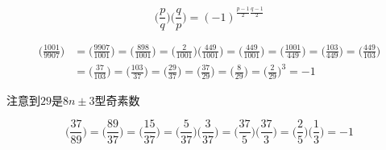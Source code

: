 \begin{theorem}[Gauss二次互反律]
	\begin{equation*}
		\Big(\frac{p}{q} \Big)\Big(\frac{q}{p}\Big)=(-1)^{\frac{p-1}{2}\frac{q-1}{2}}
	\end{equation*}
\end{theorem}
\begin{example}
	\begin{equation*}
		\begin{split}
			\Big(\frac{1001}{9907}\Big) &= \Big(\frac{9907}{1001}\Big) = \Big(\frac{898}{1001}\Big) = \Big(\frac{2}{1001}\Big)\Big(\frac{449}{1001}\Big) = \Big(\frac{449}{1001}\Big) = \Big(\frac{1001}{449}\Big) = \Big(\frac{103}{449}\Big) = \Big(\frac{449}{103}\Big)\\
			&
=\Big(\frac{37}{103}\Big)= \Big(\frac{103}{37}\Big) = \Big(\frac{29}{37}\Big) = \Big(\frac{37}{29}\Big) = \Big(\frac{8}{29}\Big) = \Big(\frac{2}{29}\Big)^3 = -1
		\end{split}
	\end{equation*} 
\end{example}
\begin{note}
	注意到$29$是$8n\pm 3$型奇素数
\end{note}
\begin{example}
	\begin{equation*}
		\Big(\frac{37}{89}\Big) = \Big(\frac{89}{37}\Big) = \Big(\frac{15}{37}\Big) = \Big(\frac{5}{37}\Big)\Big(\frac{3}{37}\Big) = \Big(\frac{37}{5}\Big)\Big(\frac{37}{3}\Big) = \Big(\frac{2}{5}\Big)
		\Big(\frac{1}{3}\Big) = -1
		\end{equation*}
\end{example}